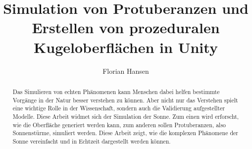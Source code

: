 \documentclass[sigconf]{acmart}
\title{Simulation von Protuberanzen und Erstellen von prozeduralen Kugeloberflächen in Unity}
\author{Florian Hansen}
\affiliation{
  \institution{Hochschule Flensburg}
  \country{Germany}
}
\begin{document}
  \begin{abstract}
    Das Simulieren von echten Phänomenen kann Menschen dabei helfen
    bestimmte Vorgänge in der Natur besser verstehen zu können. Aber
    nicht nur das Verstehen spielt eine wichtige Rolle in der Wissenschaft,
    sondern auch die Validierung aufgestellter Modelle. Diese Arbeit widmet
    sich der Simulation der Sonne. Zum einen wird erforscht, wie die 
    Oberfläche generiert werden kann, zum anderen sollen Protuberanzen, also
    Sonnenstürme, simuliert werden. Diese Arbeit zeigt, wie die komplexen
    Phänomene der Sonne vereinfacht und in Echtzeit dargestellt werden
    können.
  \end{abstract}
  \maketitle
  \pagestyle{plain}

  
  
  
  
  

  
  
\end{document}
